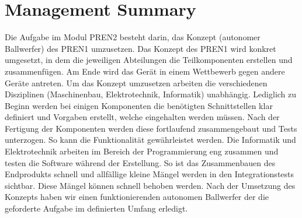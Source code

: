 \section*{Management Summary}
Die Aufgabe im Modul PREN2 besteht darin, das Konzept 
(autonomer Ballwerfer) des PREN1 umzusetzen. Das Konzept
des PREN1 wird konkret umgesetzt, in dem die jeweiligen
Abteilungen die Teilkomponenten erstellen und zusammenfügen.
Am Ende wird das Gerät in einem Wettbewerb gegen andere
Geräte antreten. Um das Konzept umzusetzen arbeiten die 
verschiedenen Disziplinen (Maschinenbau, Elektrotechnik, Informatik) 
unabhängig. Lediglich zu Beginn werden bei einigen Komponenten die 
benötigten Schnittstellen klar definiert und Vorgaben erstellt,
welche eingehalten werden müssen. Nach der Fertigung der
Komponenten werden diese fortlaufend zusammengebaut und Tests 
unterzogen. So kann die Funktionalität gewährleistet werden. 
Die Informatik und Elektrotechnik arbeiten im Bereich der 
Programmierung eng zusammen und testen die Software während 
der Erstellung. So ist das Zusammenbauen des Endprodukts schnell 
und allfällige kleine Mängel werden in den Integrationstests 
sichtbar. Diese Mängel können schnell behoben werden. Nach der 
Umsetzung des Konzepts haben wir einen funktionierenden 
autonomen Ballwerfer der die geforderte Aufgabe im definierten 
Umfang erledigt.
